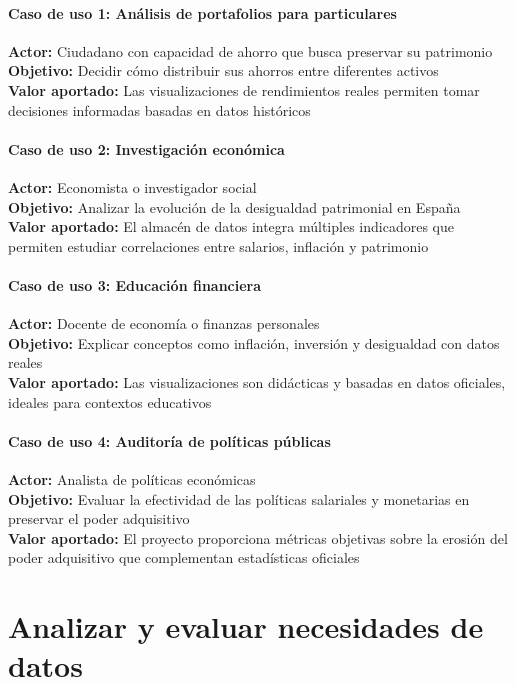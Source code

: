 \documentclass{article}
\begin{document}
\paragraph{Caso de uso 1: An\'alisis de portafolios para particulares}
\textbf{Actor:} Ciudadano con capacidad de ahorro que busca preservar su patrimonio\\
\textbf{Objetivo:} Decidir c\'omo distribuir sus ahorros entre diferentes activos\\
\textbf{Valor aportado:} Las visualizaciones de rendimientos reales permiten tomar decisiones informadas basadas en datos hist\'oricos

\paragraph{Caso de uso 2: Investigaci\'on econ\'omica}
\textbf{Actor:} Economista o investigador social\\
\textbf{Objetivo:} Analizar la evoluci\'on de la desigualdad patrimonial en Espa\~na\\
\textbf{Valor aportado:} El almac\'en de datos integra m\'ultiples indicadores que permiten estudiar correlaciones entre salarios, inflaci\'on y patrimonio

\paragraph{Caso de uso 3: Educaci\'on financiera}
\textbf{Actor:} Docente de econom\'ia o finanzas personales\\
\textbf{Objetivo:} Explicar conceptos como inflaci\'on, inversi\'on y desigualdad con datos reales\\
\textbf{Valor aportado:} Las visualizaciones son did\'acticas y basadas en datos oficiales, ideales para contextos educativos

\paragraph{Caso de uso 4: Auditor\'ia de pol\'iticas p\'ublicas}
\textbf{Actor:} Analista de pol\'iticas econ\'omicas\\
\textbf{Objetivo:} Evaluar la efectividad de las pol\'iticas salariales y monetarias en preservar el poder adquisitivo\\
\textbf{Valor aportado:} El proyecto proporciona m\'etricas objetivas sobre la erosi\'on del poder adquisitivo que complementan estad\'isticas oficiales


\section{Analizar y evaluar necesidades de datos}
\end{document}
